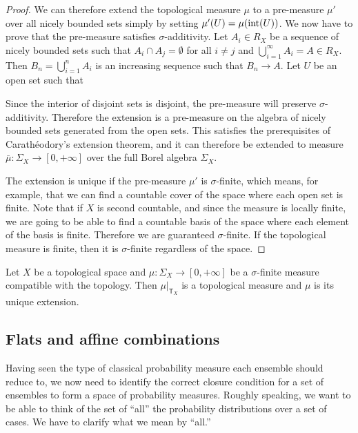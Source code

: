 \begin{mathSection}
\begin{proof}
	We can therefore extend the topological measure $\mu$ to a pre-measure $\mu'$ over all nicely bounded sets simply by setting $\mu'(U) = \mu(\operatorname{int}(U))$. We now have to prove that the pre-measure satisfies $\sigma$-additivity. Let $A_i \in R_X$ be a sequence of nicely bounded sets such that $A_i \cap A_j = \emptyset$ for all $i \neq j$ and $\bigcup_{i = 1}^{\infty}A_i = A \in R_X$. Then $B_n = \bigcup_{i = 1}^{n}A_i$ is an increasing sequence such that $B_n \to A$. Let $U$ be an open set such that 
	
	Since the interior of disjoint sets is disjoint, the pre-measure will preserve $\sigma$-additivity. Therefore the extension is a pre-measure on the algebra of nicely bounded sets generated from the open sets. This satisfies the prerequisites of Carathéodory's extension theorem, and it can therefore be extended to measure $\bar{\mu} : \Sigma_X \to [0,+\infty]$ over the full Borel algebra $\Sigma_X$.
	
	The extension is unique if the pre-measure $\mu'$ is $\sigma$-finite, which means, for example, that we can find a countable cover of the space where each open set is finite. Note that if $X$ is second countable, and since the measure is locally finite, we are going to be able to find a countable basis of the space where each element of the basis is finite. Therefore we are guaranteed $\sigma$-finite. If the topological measure is finite, then it is $\sigma$-finite regardless of the space.
\end{proof}

\begin{conj}
	Let $X$ be a topological space and $\mu : \Sigma_X \to [0,+\infty]$ be a $\sigma$-finite measure compatible with the topology. Then $\left.\mu\right|_{\textsf{T}_X}$ is a topological measure and $\mu$ is its unique extension.
\end{conj}
\end{mathSection}

\subsection{Flats and affine combinations}

Having seen the type of classical probability measure each ensemble should reduce to, we now need to identify the correct closure condition for a set of ensembles to form a space of probability measures. Roughly speaking, we want to be able to think of the set of ``all'' the probability distributions over a set of cases. We have to clarify what we mean by ``all.''

